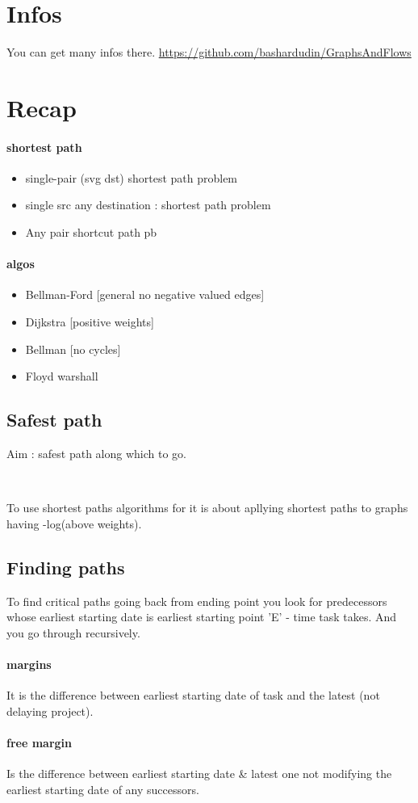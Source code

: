 \documentclass[a4paper,11pt]{article}
\title{}
\author{Bashar DUDIN}
\date{}
\begin{document}
\maketitle
\tableofcontents
\newpage
\section{Infos}
You can get many infos there.
\url{https://github.com/bashardudin/GraphsAndFlows}

\section{Recap}
\paragraph{shortest path}
\begin{itemize}
  \item single-pair (svg dst) shortest path problem
  \item single src any destination : shortest path problem
  \item Any pair shortcut path pb
\end{itemize}

\paragraph{algos}
\begin{itemize}
  \item Bellman-Ford [general no negative valued edges]
  \item Dijkstra [positive weights]
  \item Bellman  [no cycles]
  \item Floyd warshall 
\end{itemize}



\subsection{Safest path}
Aim : safest path along which to go.

\

To use shortest paths algorithms for it  is about apllying shortest paths to graphs having  -log(above weights).

\subsection{Finding paths}
To find critical paths going back from ending point you look for predecessors whose earliest starting date  is earliest starting point 'E' - time task takes. And you go through recursively.

\paragraph{margins} \hfill \break
It is the difference between earliest starting date of task and the latest (not delaying project).

\paragraph{free margin} \hfill \break
Is the difference between earliest starting date \& latest one not modifying the earliest starting date of any successors.\\
\end{document}
